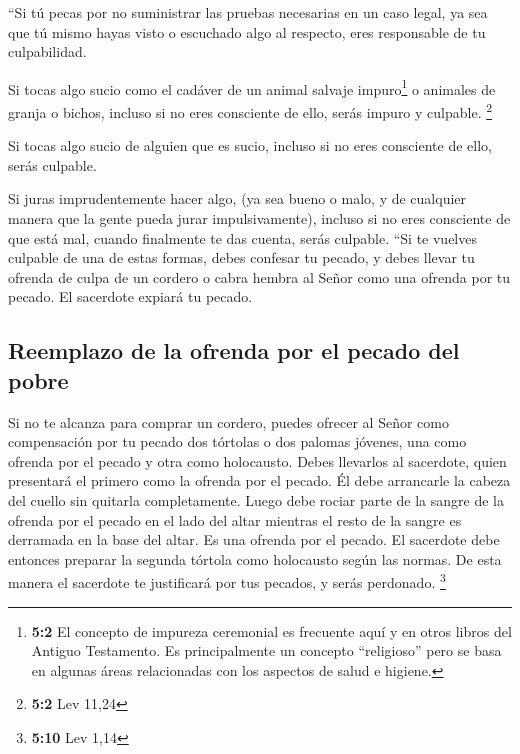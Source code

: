  ``Si tú pecas por no suministrar las pruebas necesarias
en un caso legal, ya sea que tú mismo hayas visto o escuchado algo al
respecto, eres responsable de tu culpabilidad.

 Si tocas algo sucio como el cadáver de un animal salvaje
impuro\footnote{\textbf{5:2} El concepto de impureza ceremonial es
  frecuente aquí y en otros libros del Antiguo Testamento. Es
  principalmente un concepto ``religioso'' pero se basa en algunas áreas
  relacionadas con los aspectos de salud e higiene.} o animales de
granja o bichos, incluso si no eres consciente de ello, serás impuro y
culpable. \footnote{\textbf{5:2} Lev 11,24}

 Si tocas algo sucio de alguien que es sucio, incluso si
no eres consciente de ello, serás culpable.

 Si juras imprudentemente hacer algo, (ya sea bueno o
malo, y de cualquier manera que la gente pueda jurar impulsivamente),
incluso si no eres consciente de que está mal, cuando finalmente te das
cuenta, serás culpable.  ``Si te vuelves culpable de una
de estas formas, debes confesar tu pecado,  y debes llevar
tu ofrenda de culpa de un cordero o cabra hembra al Señor como una
ofrenda por tu pecado. El sacerdote expiará tu pecado.

\hypertarget{reemplazo-de-la-ofrenda-por-el-pecado-del-pobre}{%
\subsection{Reemplazo de la ofrenda por el pecado del
pobre}\label{reemplazo-de-la-ofrenda-por-el-pecado-del-pobre}}

 Si no te alcanza para comprar un cordero, puedes ofrecer
al Señor como compensación por tu pecado dos tórtolas o dos palomas
jóvenes, una como ofrenda por el pecado y otra como holocausto.
 Debes llevarlos al sacerdote, quien presentará el primero
como la ofrenda por el pecado. Él debe arrancarle la cabeza del cuello
sin quitarla completamente.  Luego debe rociar parte de la
sangre de la ofrenda por el pecado en el lado del altar mientras el
resto de la sangre es derramada en la base del altar. Es una ofrenda por
el pecado.  El sacerdote debe entonces preparar la
segunda tórtola como holocausto según las normas. De esta manera el
sacerdote te justificará por tus pecados, y serás perdonado. \footnote{\textbf{5:10}
  Lev 1,14}

